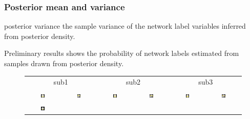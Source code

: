 \documentclass[serif]{beamer}
\begin{document}
\begin{frame}
\frametitle{Posterior mean and variance}
\begin{block}{posterior variance}
  the sample variance of the network label variables
  inferred from posterior density.
\end{block}
  Preliminary results shows the  probability of network labels
  estimated from samples drawn from posterior density.
\begin{figure}[htb]
  \centering
  \begin{tabular}[b]{cc|cc|cc}
    \multicolumn{2}{c}{sub1} &
    \multicolumn{2}{c}{sub2} &
    \multicolumn{2}{c}{sub3} \\
    \includegraphics[width=0.12\textwidth]{figure3/dmn_a} &
    \includegraphics[width=0.12\textwidth]{figure3/dmn_s} &
    \includegraphics[width=0.12\textwidth]{figure3/dmn_sub17_a} &
    \includegraphics[width=0.12\textwidth]{figure3/dmn_sub17_s} &
    \includegraphics[width=0.12\textwidth]{figure3/dmn_sub21_a} &
    \includegraphics[width=0.12\textwidth]{figure3/dmn_sub21_s} \\
    \includegraphics[width=0.12\textwidth]{figure3/atten_a} &

\end{tabular}
\end{figure}
\end{frame}
\end{document}
